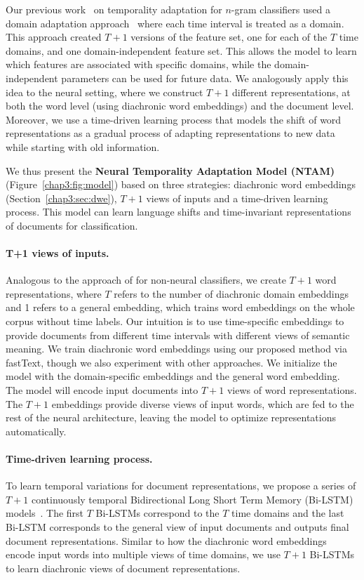 Our previous work~\cite{huang2018examining} on temporality adaptation for $n$-gram classifiers used a domain adaptation approach~\cite{daume2007frustratingly} where 
each time interval is treated as a domain.
This approach created $T+1$ versions of the feature set, one for each of the $T$ time domains, and one domain-independent feature set.
This allows the model to learn which features are associated with specific domains, while the domain-independent parameters can be used for future data.
We analogously apply this idea to the neural setting, where we construct $T+1$ different representations, at both the word level (using diachronic word embeddings) and the document level.
Moreover, we use a time-driven learning process that models
the shift of word representations as a gradual process of adapting representations to new data while starting with old information.

We thus present the {\bf Neural Temporality Adaptation Model (NTAM)} (Figure~\ref{chap3:fig:model}) based on three strategies: diachronic word embeddings (Section~\ref{chap3:sec:dwe}), $T+1$ views of inputs and a time-driven learning process.
This model can learn language shifts and time-invariant representations of documents for classification.

\paragraph{T+1 views of inputs.}
Analogous to the approach of \cite{daume2007frustratingly} for non-neural classifiers, 
we create $T+1$ word representations, where $T$ refers to the number of diachronic domain embeddings and 1 refers to a general embedding, which trains word embeddings on the whole corpus without time labels. Our intuition is to use time-specific embeddings to provide documents from different time intervals with different views of semantic meaning. 
We train diachronic word embeddings using our proposed method via fastText, though we also experiment with other approaches. 
We initialize the model with the domain-specific embeddings and the general word embedding. The model will encode input documents into $T+1$ views of word representations. 
The $T+1$ embeddings provide diverse views of input words, which are fed to the rest of the neural architecture, leaving the model to optimize representations automatically.

\paragraph{Time-driven learning process.}
To learn temporal variations for document representations, we propose a series of $T+1$ continuously temporal Bidirectional Long Short Term Memory (Bi-LSTM) models~\cite{hochreiter1997long}. The first $T$ Bi-LSTMs correspond to the $T$ time domains and the last Bi-LSTM corresponds to the general view of input documents and outputs final document representations. Similar to how the diachronic word embeddings encode input words into multiple views of time domains, we use $T+1$ Bi-LSTMs to learn diachronic views of document representations. 

